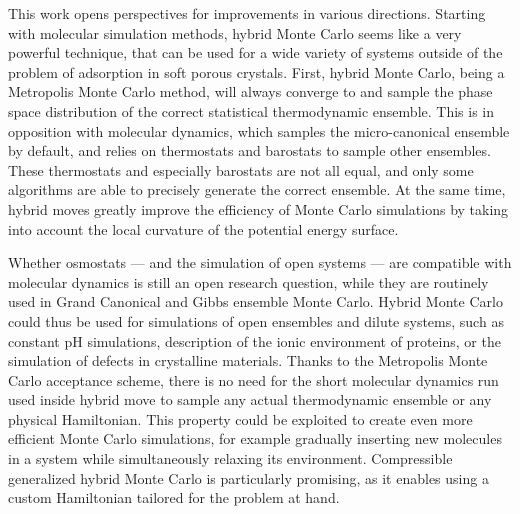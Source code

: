 \begin{center}
\end{center}

This work opens perspectives for improvements in various directions. Starting
with molecular simulation methods, hybrid Monte Carlo seems like a very powerful
technique, that can be used for a wide variety of systems outside of the problem
of adsorption in soft porous crystals. First, hybrid Monte Carlo, being a
Metropolis Monte Carlo method, will always converge to and sample the phase
space distribution of the correct statistical thermodynamic ensemble. This is in
opposition with molecular dynamics, which samples the micro-canonical ensemble
by default, and relies on thermostats and barostats to sample other ensembles.
These thermostats and especially barostats are not all equal, and only some
algorithms are able to precisely generate the correct ensemble. At the same
time, hybrid moves greatly improve the efficiency of Monte Carlo simulations by
taking into account the local curvature of the potential energy surface.

Whether osmostats --- and the simulation of open systems --- are compatible with
molecular dynamics is still an open research question, while they are routinely
used in Grand Canonical and Gibbs ensemble Monte Carlo. Hybrid Monte Carlo could
thus be used for simulations of open ensembles and dilute systems, such as
constant pH simulations, description of the ionic environment of proteins, or
the simulation of defects in crystalline materials. Thanks to the Metropolis
Monte Carlo acceptance scheme, there is no need for the short molecular dynamics
run used inside hybrid move to sample any actual thermodynamic ensemble or any
physical Hamiltonian. This property could be exploited to create even more
efficient Monte Carlo simulations, for example gradually inserting new molecules
in a system while simultaneously relaxing its environment. Compressible
generalized hybrid Monte Carlo is particularly promising, as it enables using a
custom Hamiltonian tailored for the problem at hand.

